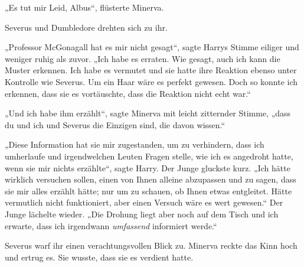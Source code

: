 „Es tut mir Leid, Albus“, flüsterte Minerva.

Severus und Dumbledore drehten sich zu ihr.

„Professor McGonagall hat es mir nicht gesagt“, sagte Harrys Stimme eiliger und weniger ruhig als zuvor. „Ich habe es erraten. Wie gesagt, auch ich kann die Muster erkennen. Ich habe es vermutet und sie hatte ihre Reaktion ebenso unter Kontrolle wie Severus. Um ein Haar wäre es perfekt gewesen. Doch so konnte ich erkennen, dass sie es vortäuschte, dass die Reaktion nicht echt war.“

„Und ich habe ihm erzählt“, sagte Minerva mit leicht zitternder Stimme, „dass du und ich und Severus die Einzigen sind, die davon wissen.“

„Diese Information hat sie mir zugestanden, um zu verhindern, dass ich umherlaufe und irgendwelchen Leuten Fragen stelle, wie ich es angedroht hatte, wenn sie mir nichts erzählte“, sagte Harry. Der Junge gluckste kurz. „Ich hätte wirklich versuchen sollen, einen von Ihnen alleine abzupassen und zu sagen, dass sie mir alles erzählt hätte; nur um zu schauen, ob Ihnen etwas entgleitet. Hätte vermutlich nicht funktioniert, aber einen Versuch wäre es wert gewesen.“ Der Junge lächelte wieder. „Die Drohung liegt aber noch auf dem Tisch und ich erwarte, dass ich irgendwann \emph{umfassend} informiert werde.“

Severus warf ihr einen verachtungsvollen Blick zu. Minerva reckte das Kinn hoch und ertrug es. Sie wusste, dass sie es verdient hatte.


